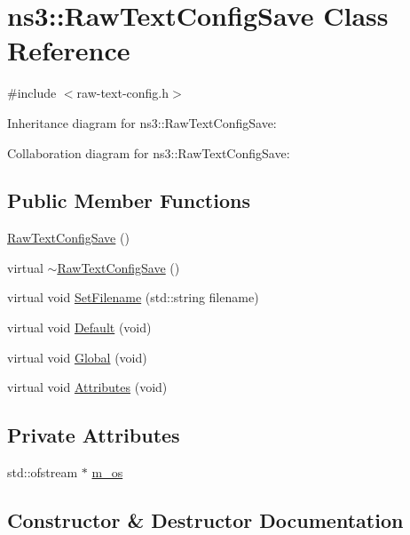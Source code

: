 \hypertarget{classns3_1_1RawTextConfigSave}{}\section{ns3\+:\+:Raw\+Text\+Config\+Save Class Reference}
\label{classns3_1_1RawTextConfigSave}


{\ttfamily \#include $<$raw-\/text-\/config.\+h$>$}



Inheritance diagram for ns3\+:\+:Raw\+Text\+Config\+Save\+:


Collaboration diagram for ns3\+:\+:Raw\+Text\+Config\+Save\+:
\subsection*{Public Member Functions}
\begin{DoxyCompactItemize}
\item 
\hyperlink{classns3_1_1RawTextConfigSave_a805a1262f30f10f08bd33afac842e065}{Raw\+Text\+Config\+Save} ()
\item 
virtual \hyperlink{classns3_1_1RawTextConfigSave_a313e458b26346ad4fb90c9c7c26b524f}{$\sim$\+Raw\+Text\+Config\+Save} ()
\item 
virtual void \hyperlink{classns3_1_1RawTextConfigSave_a6ea0b8b0c61abf6cf9caa3b5e3742aaa}{Set\+Filename} (std\+::string filename)
\item 
virtual void \hyperlink{classns3_1_1RawTextConfigSave_acdfb9ec3d86df8ff4d21d3cf9eda794e}{Default} (void)
\item 
virtual void \hyperlink{classns3_1_1RawTextConfigSave_aedac65aa213d155d05ef03aa039bcda3}{Global} (void)
\item 
virtual void \hyperlink{classns3_1_1RawTextConfigSave_a2e7b740f700bca0fa1f52bdc40af751e}{Attributes} (void)
\end{DoxyCompactItemize}
\subsection*{Private Attributes}
\begin{DoxyCompactItemize}
\item 
std\+::ofstream $\ast$ \hyperlink{classns3_1_1RawTextConfigSave_a0ac116e28670534f1de97cc5d2b2e24e}{m\+\_\+os}
\end{DoxyCompactItemize}


\subsection{Constructor \& Destructor Documentation}
